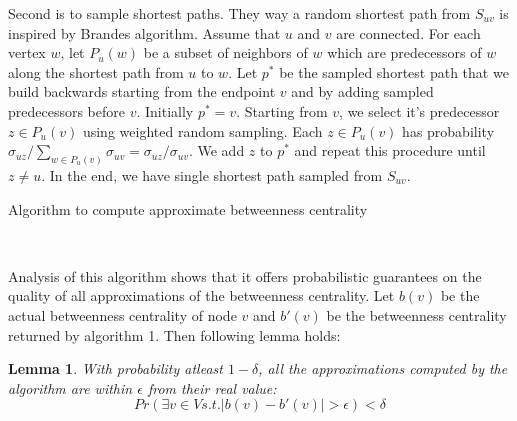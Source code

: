 \documentclass[runningheads,a4paper]{llncs}
\newtheorem{mylemma}{Lemma}
\begin{document}
Second is to sample shortest paths. They way a random shortest path from $S_{uv}$ is inspired by Brandes algorithm\cite{brandes}. Assume that $u$ and $v$ are connected. For each vertex $w$, let $P_{u}(w)$ be a subset of neighbors of $w$ which are predecessors of $w$ along the shortest path from $u$ to $w$. Let $p^{*}$ be the sampled shortest path that we build backwards starting from the endpoint $v$ and by adding sampled predecessors before $v$. Initially $p^{*} = {v}$. Starting from $v$, we select it's predecessor $z \in P_{u}(v)$ using weighted random sampling. Each $z \in P_{u}(v)$ has probability $\sigma_{uz}/\sum_{w \in P_{u}(v)}\sigma_{uv} = \sigma_{uz}/\sigma_{uv}$. We add $z$ to $p^{*}$ and repeat this procedure until $z \neq u$. In the end, we have single shortest path sampled from $S_{uv}$. 
 
\begin{algorithm}
\caption{Algorithm to compute approximate betweenness centrality}
\begin {algorithmic}[1]
\EndFor 
{}
\EndIf
{}
\EndWhile
\EndIf
\EndFor\\
\end{algorithmic}
\end{algorithm}

Analysis of this algorithm shows that it offers probabilistic guarantees on the quality of all approximations of the betweenness centrality. Let $b(v)$ be the actual betweenness centrality of node $v$ and $b'(v)$ be the betweenness centrality returned by algorithm 1. Then following lemma holds:

\begin{mylemma}
With probability atleast $1-\delta$, all the approximations computed by the algorithm are within $\epsilon$ from their real value:
$$Pr(\exists v \in V s.t. |b(v) - b'(v)| > \epsilon) < \delta$$
\end{mylemma}
\end{document}
